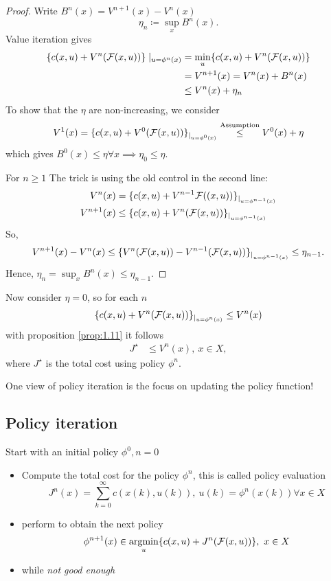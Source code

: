 \begin{proof}
    Write \(B^n(x)=V^{n+1}(x)-V^n(x)\)
    \[\eta_n\coloneqq \sup_x B^n(x).\]
    Value iteration gives 
    \begin{align*}
        \{c(x,u)+V^n(\mathcal{F}(x,u))\}\mid_{u=\phi^n(x)}&=\min_u\{c(x,u)+V^n(\mathcal{F}(x,u))\}\\
        &=V^{n+1}(x)=V^n(x)+B^n(x)\\
        &\leq V^n(x)+\eta_n 
    \end{align*}
    To show that the \(\eta\) are non-increasing, we consider 
    \begin{align*}
        V^1(x)=\{c(x,u)+V^0(\mathcal{F}(x,u))\}_{|_{u=\phi^0(x)}}\stackrel{\text{Assumption}}{\leq} V^0(x)+\eta
    \end{align*}
    which gives \(B^0(x)\leq \eta\forall x\implies\eta_0\leq \eta\).

    For \(n\geq 1\) 
    The trick is using the old control in the second line:
    \begin{align*}
        V^n(x)&=\{c(x,u)+V^{n-1}\mathcal{F}((x,u))\}_{|_{u=\phi^{n-1}(x)}}\\
        V^{n+1}(x) &\leq \{c(x,u)+V^n(\mathcal{F}(x,u))\}_{|_{u=\phi^{n-1}(x)}}
    \end{align*}
    So, 
    \[V^{n+1}(x)-V^{n}(x)\leq \{V^n(\mathcal{F}(x,u))-V^{n-1}(\mathcal{F}(x,u))\}_{|_{u=\phi^{n-1}(x)}}\leq \eta_{n-1}.\]
    Hence, \(\eta_n=\sup_x B^n(x)\leq \eta_{n-1}\).
\end{proof}

Now consider \(\eta=0\), so for each \(n\)
\begin{align*}
    \{c(x,u)+V^n(\mathcal{F}(x,u))\}_{|_{u=\phi^n(x)}}\leq V^n(x)
\end{align*}
with proposition \ref{prop:1.11} it follows 
\begin{align*}
    J^\star &\leq V^n(x),\ x\in X,   
\end{align*}
where \(J^\star\) is the total cost using policy \(\phi^n\).

One view of policy iteration is the focus on updating the policy function!

\subsection{Policy iteration}

Start with an initial policy \(\phi^0,n=0\)
\begin{itemize}
    \item Compute the total cost for the policy \(\phi^n\), this is called policy evaluation
    \[J^n(x)=\sum_{k=0}^\infty c(x(k),u(k)),\ u(k)=\phi^n(x(k))\forall x\in X\]
    \item perform  to obtain the next policy 
    \[\phi^{n+1}(x)\in \operatorname*{\text{argmin}}_{u}\{c(x,u)+J^n(\mathcal{F}(x,u))\},\ x\in X\]
    \item while \textit{not good enough}
\end{itemize}


